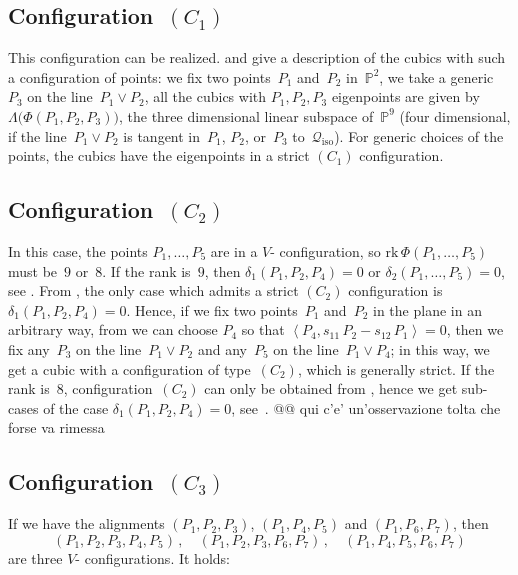 \documentclass[a4paper, 11pt, reqno]{amsart}
\theoremstyle{plain}
\theoremstyle{definition}
\newcommand{\p}{\mathbb{P}}
\newcommand{\rk}{\ensuremath{\mathrm{rk}}}
\newcommand{\iso}{\mathcal{Q}_{\mathrm{iso}}}
\newcommand{\scl}[2]{\left\langle {#1}, {#2} \right\rangle}
\begin{document}
\subsection*{Configuration~\texorpdfstring{$(C_1)$}{C1}}
This configuration can be realized.  and 
give a description of the cubics with such a configuration of points:
we fix two points~$P_1$ and~$P_2$ in~$\p^2$, we take a generic~$P_3$
on the line~$P_1 \vee P_2$, all the cubics with
$P_1, P_2, P_3$ eigenpoints are given by $\Lambda \bigl( \Phi(P_1, P_2, P_3) \bigr)$, the three
dimensional linear subspace of~$\p^9$ (four dimensional, if the
line~$P_1 \vee P_2$ is tangent in~$P_1$, $P_2$, or~$P_3$ to~$\iso$). For generic choices of the points, the cubics have the eigenpoints in a strict 
$(C_1)$ configuration.

\subsection*{Configuration~\texorpdfstring{$(C_2)$}{C2}}
In this case, the points
$P_1, \dots, P_5$ are in a
$V$- configuration, so $\rk \, \Phi(P_1, \dotsc, P_5)$
must be~$9$ or~$8$. If the rank is~$9$, then $\delta_1(P_1, P_2, P_4) = 0$
or $\delta_2(P_1, \dotsc, P_5) = 0$, see .
From , the only case
which admits a strict $(C_2)$ configuration 
is $\delta_1(P_1, P_2, P_4) = 0$. Hence, if we fix two points~$P_1$ and~$P_2$
in the plane in an arbitrary way, from  we can choose $P_4$ so that
$\scl{P_4}{s_{11}\, P_2 - s_{12} \, P_1}=0$, then we fix any~$P_3$
on the line~$P_1 \vee P_2$ and any~$P_5$ on the line~$P_1 \vee P_4$; in this way, we get a cubic with a configuration of type~$(C_2)$, which is generally strict. If the rank is~$8$, configuration~$(C_2)$ can only be obtained from , hence we get sub-cases of the case $\delta_1(P_1, P_2, P_4)=0$, see~.
@@ qui c'e' un'osservazione tolta che forse va rimessa


\subsection*{Configuration~\texorpdfstring{$(C_3)$}{C3}}
If we have the alignments $(P_1, P_2, P_3)$, $(P_1, P_4, P_5)$ and $(P_1, P_6, P_7)$, then
%
\[
 (P_1, P_2, P_3, P_4, P_5) \,, \quad (P_1, P_2, P_3, P_6, P_7) \,, \quad (P_1, P_4, P_5, P_6, P_7)
\]
%
are three $V$- configurations. It holds:
\end{document}
